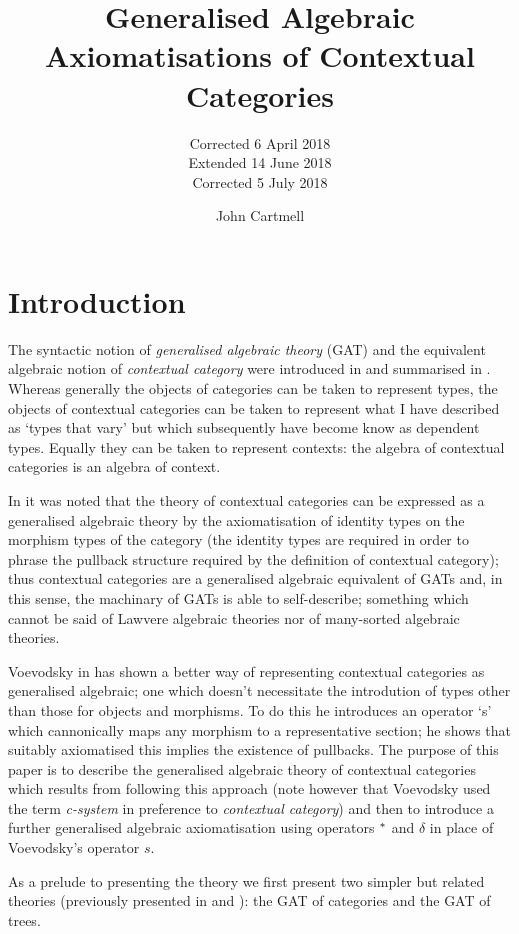 \documentclass[10pt,a4paper]{scrartcl}
\title{Generalised Algebraic Axiomatisations of Contextual Categories}
\subtitle{Corrected 6 April 2018 \\
          Extended 14 June 2018 \\
					Corrected 5 July 2018}
\author{John Cartmell}
\date{}
\begin{document}
\maketitle


\section{Introduction}
The syntactic notion of \textit{generalised algebraic theory} (GAT) and the  equivalent algebraic notion of \textit{contextual category} were introduced in  \cite{Cartmell78} and summarised in \cite{Cartmell86}. Whereas generally the objects of categories can be taken to represent types, the objects of contextual categories can be taken to represent what I have described as `types that vary' but which subsequently have become know as dependent types. Equally they can be taken to represent contexts: the algebra of contextual categories is an algebra of context. 

In \cite{Cartmell78} it was noted that the theory of contextual categories can be expressed as a generalised algebraic theory by the axiomatisation of identity types on the morphism types of the category 
(the identity types are required in order to phrase the pullback structure required by the definition of contextual category); thus contextual categories are a generalised algebraic equivalent of GATs and, in this sense, the machinary of GATs is able to self-describe; something which cannot be said of Lawvere algebraic theories nor of many-sorted algebraic theories.  

 Voevodsky in \cite{Voevodsky14C} has shown a better way of representing contextual categories as generalised algebraic; one which doesn't necessitate the introdution of types other than those for objects and morphisms. To do this he introduces an operator `s' which cannonically maps any morphism to a representative section; he shows that suitably axiomatised this implies the existence of pullbacks.  The purpose of this paper is to describe the generalised algebraic theory
of contextual categories which results from following this approach (note however that Voevodsky used the term \textit{c-system} in preference to \textit{contextual category}) and then to introduce a further generalised algebraic axiomatisation using operators $^*$ and $\delta$ in place of Voevodsky's operator $s$.   

As a prelude to presenting the theory we first present two simpler but related theories (previously presented in \cite{Cartmell78} and \cite{Cartmell86}): the GAT of categories and the GAT of trees.
\end{document}

